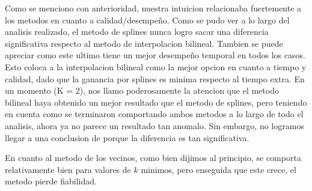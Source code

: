 Como se menciono con anterioridad, nuestra intuicion relacionaba fuertemente a los metodos en cuanto a calidad/desempe\~no.
Como se pudo ver a lo largo del analisis realizado, el metodo de splines nunca logro sacar una diferencia significativa respecto al metodo de interpolacion bilineal. Tambien se puede apreciar como este ultimo tiene un mejor desempe\~no temporal en todos los casos.
Esto coloca a la interpolacion bilineal como la mejor opcion en cuanto a tiempo y calidad, dado que la ganancia por splines es minima respecto al tiempo extra. En un momento (K = 2), nos llamo poderosamente la atencion que el metodo bilineal haya obtenido un mejor resultado que el metodo de splines, pero teniendo en cuenta como se terminaron comportando ambos metodos a lo largo de todo el analisis, ahora ya no parece un resultado tan anomalo. Sin embargo, no logramos llegar a una conclusion de porque la diferencia es tan significativa.

En cuanto al metodo de los vecinos, como bien dijimos al principio, se comporta relativamente bien para valores de $k$ minimos, pero enseguida que este crece, el metodo pierde fiabilidad.
